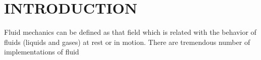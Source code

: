 \chapter{INTRODUCTION}
\indent\indent\indent
 Fluid mechanics can be defined as that field which is related
with the behavior of fluids (liquids and gases) at rest or in motion. There are tremendous number of implementations of fluid